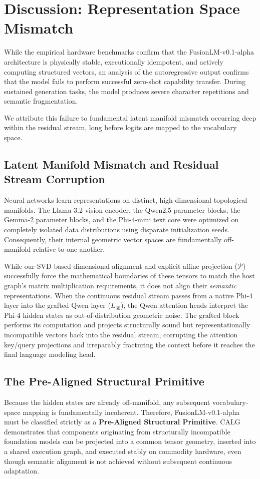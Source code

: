 \documentclass[11pt]{article}
\begin{document}
\section{Discussion: Representation Space Mismatch}
While the empirical hardware benchmarks confirm that the FusionLM-v0.1-alpha architecture is physically stable, executionally idempotent, and actively computing structured vectors, an analysis of the autoregressive output confirms that the model fails to perform successful zero-shot capability transfer. During sustained generation tasks, the model produces severe character repetitions and semantic fragmentation.

We attribute this failure to fundamental latent manifold mismatch occurring deep within the residual stream, long before logits are mapped to the vocabulary space.

\subsection{Latent Manifold Mismatch and Residual Stream Corruption}
Neural networks learn representations on distinct, high-dimensional topological manifolds. The Llama-3.2 vision encoder, the Qwen2.5 parameter blocks, the Gemma-2 parameter blocks, and the Phi-4-mini text core were optimized on completely isolated data distributions using disparate initialization seeds. Consequently, their internal geometric vector spaces are fundamentally off-manifold relative to one another.

While our SVD-based dimensional alignment and explicit affine projection ($\mathcal{P}$) successfully force the mathematical boundaries of these tensors to match the host graph's matrix multiplication requirements, it does not align their \textit{semantic} representations. When the continuous residual stream passes from a native Phi-4 layer into the grafted Qwen layer ($L_{30}$), the Qwen attention heads interpret the Phi-4 hidden states as out-of-distribution geometric noise. The grafted block performs its computation and projects structurally sound but representationally incompatible vectors back into the residual stream, corrupting the attention key/query projections and irreparably fracturing the context before it reaches the final language modeling head.

\subsection{The Pre-Aligned Structural Primitive}
Because the hidden states are already off-manifold, any subsequent vocabulary-space mapping is fundamentally incoherent. Therefore, FusionLM-v0.1-alpha must be classified strictly as a \textbf{Pre-Aligned Structural Primitive}. CALG demonstrates that components originating from structurally incompatible foundation models can be projected into a common tensor geometry, inserted into a shared execution graph, and executed stably on commodity hardware, even though semantic alignment is not achieved without subsequent continuous adaptation.
\end{document}
